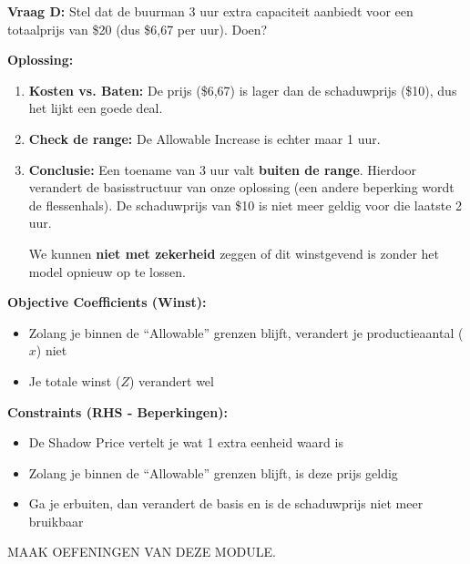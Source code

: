 \documentclass[a4paper,11pt]{article}
\begin{document}
\begin{oefenblok}
    \vspace{5mm}

    \textbf{Vraag D:} Stel dat de buurman 3 uur extra capaciteit aanbiedt voor een totaalprijs van \$20
    (dus \$6,67 per uur). Doen?

    \textbf{Oplossing:}
    \begin{enumerate}
        \item \textbf{Kosten vs. Baten:} De prijs (\$6,67) is lager dan de schaduwprijs (\$10),
              dus het lijkt een goede deal.
        \item \textbf{Check de range:} De Allowable Increase is echter maar 1 uur.
        \item \textbf{Conclusie:} Een toename van 3 uur valt \textbf{buiten de range}.
              Hierdoor verandert de basisstructuur van onze oplossing (een andere beperking wordt de flessenhals).
              De schaduwprijs van \$10 is niet meer geldig voor die laatste 2 uur.

              We kunnen \textbf{niet met zekerheid} zeggen of dit winstgevend is zonder het model opnieuw op te lossen.
    \end{enumerate}
\end{oefenblok}

\begin{conceptbox}
    \textbf{Objective Coefficients (Winst):}
    \begin{itemize}
        \item Zolang je binnen de ``Allowable'' grenzen blijft, verandert je productieaantal ($x$) niet
        \item Je totale winst ($Z$) verandert wel
    \end{itemize}

    \textbf{Constraints (RHS - Beperkingen):}
    \begin{itemize}
        \item De Shadow Price vertelt je wat 1 extra eenheid waard is
        \item Zolang je binnen de ``Allowable'' grenzen blijft, is deze prijs geldig
        \item Ga je erbuiten, dan verandert de basis en is de schaduwprijs niet meer bruikbaar
    \end{itemize}
\end{conceptbox}

\begin{examenbox}
    MAAK OEFENINGEN VAN DEZE MODULE.
\end{examenbox}
\end{document}
